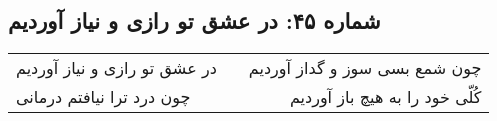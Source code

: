 \begin{center}
\section*{شماره ۴۵: در عشق تو رازی و نیاز آوردیم}
\label{sec:045}
\begin{longtable}{l p{0.5cm} r}
در عشق تو رازی و نیاز آوردیم
&&
چون شمع بسی سوز و گداز آوردیم
\\
چون درد ترا نیافتم درمانی
&&
کُلّی خود را به هیچ باز آوردیم
\\
\end{longtable}
\end{center}

